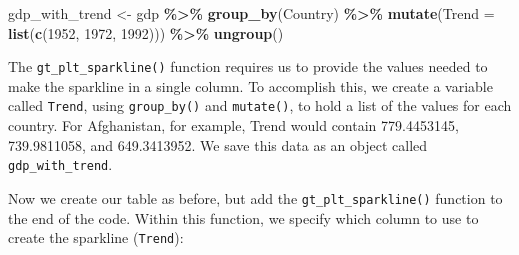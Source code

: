 \documentclass[
]{book}
\newenvironment{Shaded}{\begin{snugshade}}{\end{snugshade}}
\newcommand{\AttributeTok}[1]{\textcolor[rgb]{0.13,0.29,0.53}{#1}}
\newcommand{\FunctionTok}[1]{\textcolor[rgb]{0.13,0.29,0.53}{\textbf{#1}}}
\newcommand{\NormalTok}[1]{#1}
\newcommand{\OtherTok}[1]{\textcolor[rgb]{0.56,0.35,0.01}{#1}}
\newcommand{\SpecialCharTok}[1]{\textcolor[rgb]{0.81,0.36,0.00}{\textbf{#1}}}
\newcommand{\StringTok}[1]{\textcolor[rgb]{0.31,0.60,0.02}{#1}}
\begin{document}
\begin{Shaded}
\begin{Highlighting}[]
\NormalTok{gdp\_with\_trend }\OtherTok{\textless{}{-}}\NormalTok{ gdp }\SpecialCharTok{\%\textgreater{}\%}
  \FunctionTok{group\_by}\NormalTok{(Country) }\SpecialCharTok{\%\textgreater{}\%}
  \FunctionTok{mutate}\NormalTok{(}\AttributeTok{Trend =} \FunctionTok{list}\NormalTok{(}\FunctionTok{c}\NormalTok{(}\StringTok{\textasciigrave{}}\AttributeTok{1952}\StringTok{\textasciigrave{}}\NormalTok{, }\StringTok{\textasciigrave{}}\AttributeTok{1972}\StringTok{\textasciigrave{}}\NormalTok{, }\StringTok{\textasciigrave{}}\AttributeTok{1992}\StringTok{\textasciigrave{}}\NormalTok{))) }\SpecialCharTok{\%\textgreater{}\%}
  \FunctionTok{ungroup}\NormalTok{()}
\end{Highlighting}
\end{Shaded}

The \texttt{gt\_plt\_sparkline()} function requires us to provide the values needed to make the sparkline in a single column. To accomplish this, we create a variable called \texttt{Trend}, using \texttt{group\_by()} and \texttt{mutate()}, to hold a list of the values for each country. For Afghanistan, for example, Trend would contain 779.4453145, 739.9811058, and 649.3413952. We save this data as an object called \texttt{gdp\_with\_trend}.

Now we create our table as before, but add the \texttt{gt\_plt\_sparkline()} function to the end of the code. Within this function, we specify which column to use to create the sparkline (\texttt{Trend}):
\end{document}
